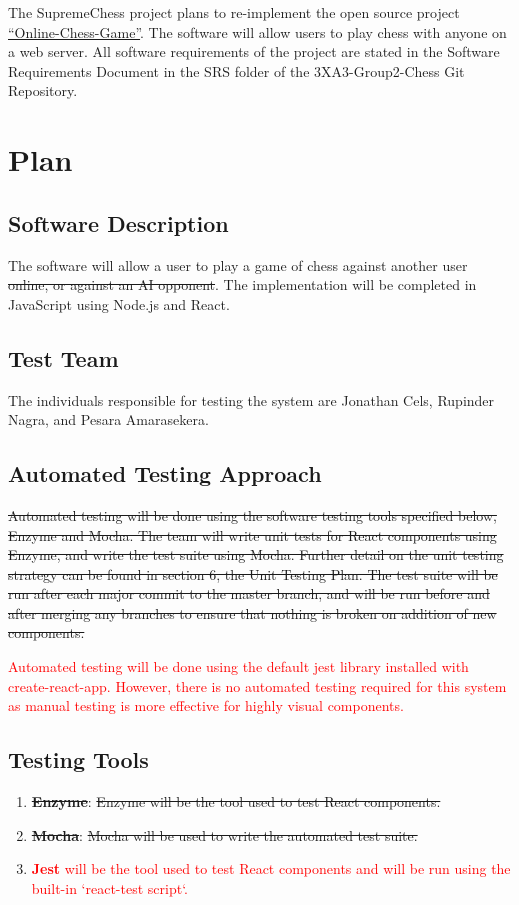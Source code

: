 \documentclass[12pt, titlepage]{article}
\begin{document}
The SupremeChess project plans to re-implement the open source project \href{https://github.com/techwithtim/Online-Chess-Game}{``Online-Chess-Game''}. The software will allow users to play chess with anyone on a web server. All software requirements of the project are stated in the Software Requirements Document in the SRS folder of the 3XA3-Group2-Chess Git Repository.

\section{Plan}
	
\subsection{Software Description}

The software will allow a user to play a game of chess against another user \sout{online, or against an AI opponent}. The implementation will be completed in JavaScript using Node.js and React.

\subsection{Test Team}

The individuals responsible for testing the system are Jonathan Cels, Rupinder Nagra, and Pesara Amarasekera.

\subsection{Automated Testing Approach}

\sout{Automated testing will be done using the software testing tools specified below, Enzyme and Mocha. The team will write unit tests for React components using Enzyme, and write the test suite using Mocha. Further detail on the unit testing strategy can be found in section 6, the Unit Testing Plan. The test suite will be run after each major commit to the master branch, and will be run before and after merging any branches to ensure that nothing is broken on addition of new components.}

\textcolor{red}{Automated testing will be done using the default jest library installed with create-react-app. However, there is no automated testing required for this system as manual testing is more effective for highly visual components.}

\subsection{Testing Tools}
\begin{enumerate}
    \item \textbf{\sout{Enzyme}}:
        \sout{Enzyme will be the tool used to test React components.}
    \item \textbf{\sout{Mocha}}:
        \sout{Mocha will be used to write the automated test suite.}
    \item \textcolor{red}{\textbf{Jest} will be the tool used to test React components and will be run using the built-in `react-test script`.}
\end{enumerate}
\end{document}
